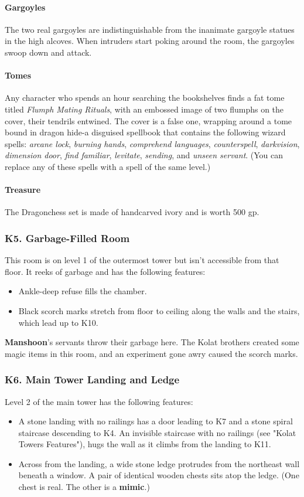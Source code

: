 \documentclass[10pt,a4paper,twoside,twocolumn,openany,nodeprecatedcode]{dndbook}
\begin{document}
\paragraph{Gargoyles}
The two real gargoyles are indistinguishable from the inanimate gargoyle statues in the high alcoves. When intruders start poking around the room, the gargoyles swoop down and attack.
\paragraph{Tomes}
Any character who spends an hour searching the bookshelves finds a fat tome titled \textit{Flumph Mating Rituals}, with an embossed image of two flumphs on the cover, their tendrils entwined. The cover is a false one, wrapping around a tome bound in dragon hide-a disguised spellbook that contains the following wizard spells: \textit{arcane lock}, \textit{burning hands}, \textit{comprehend languages}, \textit{counterspell}, \textit{darkvision}, \textit{dimension door}, \textit{find familiar}, \textit{levitate}, \textit{sending}, and \textit{unseen servant}. (You can replace any of these spells with a spell of the same level.)
\paragraph{Treasure}
The Dragonchess set is made of handcarved ivory and is worth 500 gp.
\subsubsection{K5. Garbage-Filled Room}
This room is on level 1 of the outermost tower but isn't accessible from that floor. It reeks of garbage and has the following features:
\begin{itemize}

\item Ankle-deep refuse fills the chamber.
\item Black scorch marks stretch from floor to ceiling along the walls and the stairs, which lead up to K10.
\end{itemize}


\textbf{Manshoon}'s servants throw their garbage here. The Kolat brothers created some magic items in this room, and an experiment gone awry caused the scorch marks.
\subsubsection{K6. Main Tower Landing and Ledge}
Level 2 of the main tower has the following features:
\begin{itemize}

\item A stone landing with no railings has a door leading to K7 and a stone spiral staircase descending to K4. An invisible staircase with no railings (see "Kolat Towers Features"), hugs the wall as it climbs from the landing to K11.
\item Across from the landing, a wide stone ledge protrudes from the northeast wall beneath a window. A pair of identical wooden chests sits atop the ledge. (One chest is real. The other is a \textbf{mimic}.)
\end{itemize}
\end{document}
